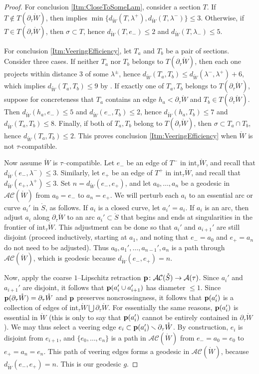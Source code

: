 \documentclass[11pt,letterpaper]{amsart}
\newcommand{\A}[0]{\mathcal{A}}
\newcommand{\mr}{\mathring}
\newcommand{\bdy}{\partial} %
\newcommand{\psub}{\mr W}
\numberwithin{equation}{section}
\theoremstyle{definition}
\renewcommand{\setminus}{\smallsetminus}
\newcommand{\AC}{\mathcal{AC}}
\newcommand{\from}{\colon} %
\newcommand{\p}{{\bf p}}
\renewcommand{\int}{\mathrm{int}}
\begin{document}
\begin{proof}
 For conclusion \eqref{Itm:CloseToSomeLam}, consider a section $T$. If $T \notin T(\bdy_\tau \psub)$, then  implies  $\min \{ d_{\psub}(T, \lambda^+), d_{\psub}(T, \lambda^-) \} \leq 3$. Otherwise, if $T \in T(\bdy_\tau \psub)$, then $\sigma \subset T$, hence $d_{\psub}(T, e_-) \leq 2$ and  $d_{\psub}(T, \lambda_-) \leq 5$.
 
For conclusion \eqref{Itm:VeeringEfficiency}, let $T_a$ and $T_b$ be a pair of sections. Consider three cases.
 If neither $T_a$ nor $T_b$ belongs to $T(\bdy_\tau \psub)$, then each one projects within distance $3$ of some $\lambda^\pm$, hence $d_{\psub}(T_a, T_b) \leq d_{\psub}(\lambda^-, \lambda^+) + 6$, which implies $d_{\psub}(T_a, T_b) \leq 9$ by . If exactly one of $T_a, T_b$ belongs to $T(\bdy_\tau \psub)$, suppose for concreteness that $T_a$ contains an edge $h_a < \bdy_\tau \psub$ and $T_b \in T(\bdy_\tau \psub)$. Then $d_{\psub}(h_a, e_-) \leq 5$ and $d_{\psub}(e_-, T_b) \leq 2$, hence $d_{\psub}(h_a, T_b) \leq 7$ and $d_{\psub}(T_a, T_b) \leq 8$. Finally, if both of $T_a, T_b$ belong to $T(\bdy_\tau \psub)$, then $\sigma \subset T_a \cap T_b$, hence $d_{\psub}(T_a, T_b) \leq 2$. This proves conclusion \eqref{Itm:VeeringEfficiency} when $\psub$ is not $\tau$-compatible. 


\smallskip

Now assume $\psub$ is $\tau$--compatible. Let $e_-$ be an edge of $T^-$ in $\int_\tau \psub$, and recall that $d_{\psub}(e_-, \lambda^-) \leq 3$. Similarly, let $e_+$ be an edge of $T^+$ in $\int_\tau \psub$, and recall that $d_{\psub}(e_+, \lambda^+) \leq 3$.
Set $n = d_{\psub}(e_-, e_+)$, and let $a_0, \ldots, a_n$ be a geodesic in $\AC(\psub)$ from $a_0 = e_-$ to $a_n =e_+$.
We will perturb each $a_i$ to an essential arc or curve $a_i'$ in $\mr S$, as follows. If $a_i$ is a closed curve, let $a_i' = a_i$. If $a_i$ is an arc, then adjust $a_i$ along $\bdy_\tau \psub$ to an arc $a_i' \subset \mr S$  that begins and ends at singularities in the frontier of $\int_\tau \psub$. This adjustment can be done so that $a_i'$ and $a_{i+1}'$ are still disjoint (proceed inductively, starting at $a_1$, and noting that $e_- = a_0$ and $e_+ = a_n$ do not need to be adjusted).  Thus $a_0, a_1', \ldots, a_{n-1}', a_n$ is a path through $\AC(\psub)$, which is geodesic because $d_{\psub}(e_-, e_+) = n$.

Now, apply the coarse $1$--Lipschitz retraction $\p \from \AC(\mr S) \to \A(\tau)$. Since $a_i'$ and $a_{i+1}'$ are disjoint, it follows that $\p(a_i' \cup a_{i+1}')$ has diameter $\leq 1$. Since $\p(\bdy_\tau \psub) = \bdy_\tau \psub$ and $\p$ preserves noncrossingness, it follows that $\p(a_i')$ is a collection of edges of $\int_\tau \psub \bigcup \bdy_\tau \psub$.
For essentially the same reasons, $\p(a_i')$ is essential in $\psub$ (this is only to say that $\p(a_i')$ cannot be entirely contained in $\bdy_\tau \psub$). We may thus select a veering edge $e_i \subset \p(a_i') \setminus \bdy_\tau \psub$. By construction, $e_i$ is disjoint from $e_{i+1}$, and $\{e_0, \ldots, e_n\}$ is a path in $\AC(\psub)$ from $e_- = a_0 = e_0$ to $e_+ = a_n = e_n$. This path of veering edges forms a geodesic in $\AC(\psub)$, because $d_{\psub}(e_-, e_+) = n$. This is our geodesic $g$.


\end{proof}
\end{document}
